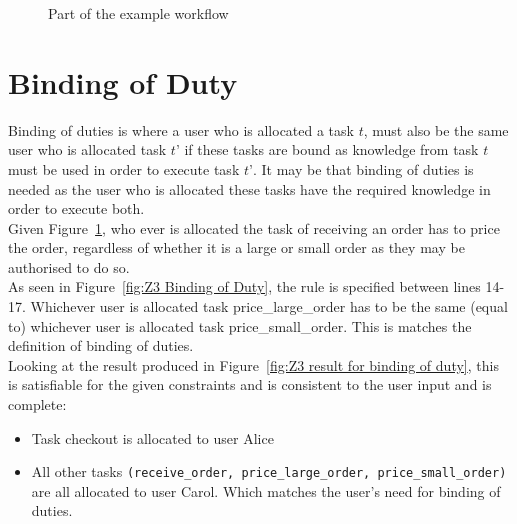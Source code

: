 \documentclass[a4paper]{report}
\begin{document}
\begin{figure}[!htb]
\centering
{}
\caption{Part of the example workflow}
\label{fig:Part of the example workflow}
\end{figure}

\section{Binding of Duty}
Binding of duties\cite{bod} is where a user who is allocated a task $t$, must also be the same user who is allocated task $t’$ if these tasks are bound as knowledge from task $t$ must be used in order to execute task $t’$. It may be that binding of duties is needed as the user who is allocated these tasks have the required knowledge in order to execute both.\\
Given Figure~\ref{fig:Part of the example workflow}, who ever is allocated the task of receiving an order has to price the order, regardless of whether it is a large or small order as they may be authorised to do so. \\
As seen in Figure~\ref{fig:Z3 Binding of Duty}, the rule is specified between lines 14-17. Whichever user is allocated task price\_large\_order has to be the same (equal to) whichever user is allocated task price\_small\_order. This is matches the definition of binding of duties.\\
Looking at the result produced in Figure~\ref{fig:Z3 result for binding of duty}, this is satisfiable for the given constraints and is consistent to the user input and is complete:
\begin{itemize}
\item Task checkout is allocated to user Alice
\item All other tasks \texttt{(receive\_order, price\_large\_order, price\_small\_order)} are all allocated to user Carol. Which matches the user’s need for binding of duties.
\end{itemize}
\end{document}
